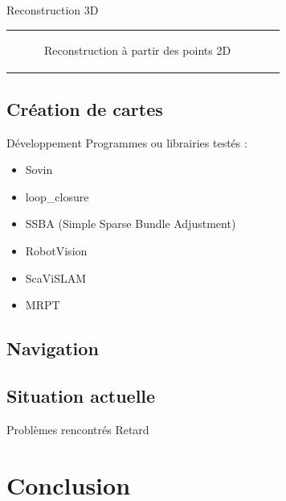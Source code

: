 \documentclass{beamer}
\begin{document}
\begin{frame}{Reconstruction 3D}
\begin{tabular}{c c}
\begin{minipage}{0.5\linewidth}
\begin{figure}
        \caption{Reconstruction à partir des points 2D}
      \end{figure}
    \end{minipage}
  \end{tabular}
\end{frame}

\subsection*{Création de cartes}
\begin{frame}{Développement}
Programmes ou librairies testés :
\begin{itemize}
  \item Sovin
  \item loop\_closure
  \item SSBA (Simple Sparse Bundle Adjustment)
  \item RobotVision
  \item ScaViSLAM
  \item MRPT
\end{itemize}
\end{frame}

\subsection*{Navigation}
\begin{frame}

\end{frame}

\subsection*{Situation actuelle}
\begin{frame}{Problèmes rencontrés}
  Retard
\end{frame}


\section{Conclusion}
\end{document}
